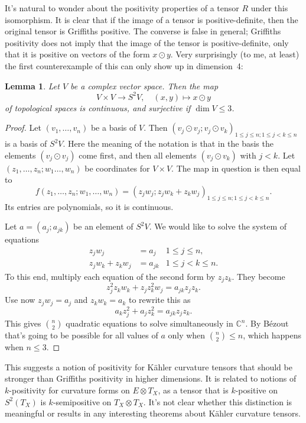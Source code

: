 \documentclass[10pt,a4paper]{article}
\newtheorem{lemm}[theo]{Lemma}
\newtheorem*{proof}{Proof}
\newcommand{\kk}[1]{\mathbb{#1}}
\begin{document}
It's natural to wonder about the positivity properties of a tensor $R$ under this isomorphism. It is clear that if the image of a tensor is positive-definite, then the original tensor is Griffiths positive. The converse is false in general; Griffiths positivity does not imply that the image of the tensor is positive-definite, only that it is positive on vectors of the form $x \odot y$. Very surprisingly (to me, at least) the first counterexample of this can only show up in dimension~4:



\begin{lemm}
Let $V$ be a complex vector space. Then the map
$$
V \times V \to S^2 V,
\quad
(x, y) \mapsto x \odot y
$$
of topological spaces is continuous, and surjective if $\dim V \leq 3$.
\end{lemm}

\begin{proof}
  Let $(v_1, \ldots, v_n)$ be a basis of $V$. Then $(v_j \odot v_j ; v_j \odot v_k)_{1 \leq j \leq n; 1 \leq j < k \leq n}$ is a basis of $S^2V$. Here the meaning of the notation is that in the basis the elements $(v_j \odot v_j)$ come first, and then all elements $(v_j \odot v_k)$ with $j < k$. Let $(z_1, \ldots, z_n; w_1 \ldots, w_n)$ be coordinates for $V \times V$. The map in question is then equal to
$$
f(z_1, \ldots, z_n; w_1, \ldots, w_n)
=( z_j w_j; z_j w_k + z_k w_j )_{1 \leq j \leq n; 1 \leq j < k \leq n}.
$$
Its entries are polynomials, so it is continuous.

Let $a = (a_j; a_{jk})$ be an element of $S^2V$. We would like to solve the system of equations
\begin{align*}
  z_j w_j &= a_j &1 \leq j \leq n,\\
  z_j w_k + z_k w_j &= a_{jk} &1 \leq j < k \leq n.
\end{align*}
To this end, multiply each equation of the second form by $z_jz_k$. They become
$$
z_j^2 z_k w_k + z_jz_k^2 w_j = a_{jk} z_jz_k.
$$
Use now $z_jw_j = a_j$ and $z_kw_k = a_k$ to rewrite this as
$$
a_k z_j^2 + a_j z_k^2 = a_{jk} z_jz_k.
$$
This gives $\binom n2$ quadratic equations to solve simultaneously in $\kk C^n$. By B\'ezout that's going to be possible for all values of $a$ only when $\binom n2 \leq n$, which happens when $n \leq 3$.
\end{proof}

This suggests a notion of positivity for K\"ahler curvature tensors that should be stronger than Griffiths positivity in higher dimensions. It is related to notions of $k$-positivity for curvature forms on $E \otimes T_X$, as a tensor that is $k$-positive on $S^2(T_X)$ is $k$-semipositive on $T_X \otimes T_X$. It's not clear whether this distinction is meaningful or results in any interesting theorems about K\"ahler curvature tensors.
\end{document}

